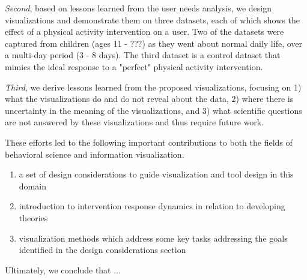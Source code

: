 \textit{Second}, based on lessons learned from the user needs analysis, we design visualizations and demonstrate them on three datasets, each of which shows the effect of a physical activity intervention on a user. Two of the datasets were captured from children (ages 11 - ???) as they went about normal daily life, over a multi-day period (3 - 8 days).  The third dataset is a control dataset that mimics the ideal response to a "perfect" physical activity intervention.

\textit{Third}, we derive lessons learned from the proposed visualizations, focusing on 1) what the visualizations do and do not reveal about the data, 2) where there is uncertainty in the meaning of the visualizations, and 3) what scientific questions are not answered by these visualizations and thus require future work.

These efforts led to the following important contributions to both the fields of behavioral science and information visualization.

\begin{enumerate}
	\item{a set of design considerations to guide visualization and tool design in this domain}
	\item{introduction to intervention response dynamics in relation to developing theories}
	\item{visualization methods which address some key tasks addressing the goals identified in the design considerations section}
\end{enumerate}

Ultimately, we conclude that ... %


